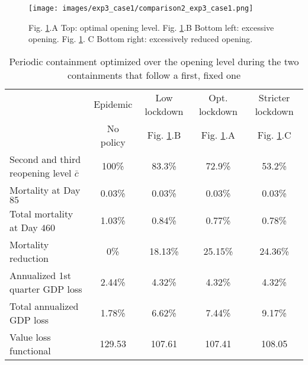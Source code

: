 \documentclass{amsart}
\begin{document}
\begin{figure}[h!]
    \centering
    \texttt{[image: images/exp3\_case1/comparison2\_exp3\_case1.png]}
    \caption{Fig. \ref{comparison2_exp3_case1}.A Top: optimal opening level. Fig. \ref{comparison2_exp3_case1}.B Bottom left: excessive opening. Fig. \ref{comparison2_exp3_case1}. C Bottom right: 
    excessively reduced opening.}
    \label{comparison2_exp3_case1}
\end{figure}


\begin{table}[htbp]
   \centering
  \caption{Periodic containment optimized over the
    opening level during the two containments 
    that follow a first, fixed one}
    \begin{tabular}{lcccc}
     & \multicolumn{1}{c}{Epidemic} & \multicolumn{1}{c}{ 
        Low lockdown} & \multicolumn{1}{c}{Opt. lockdown}& \multicolumn{1}{c}{Stricter lockdown} \\
          & \multicolumn{1}{c}{No policy } & \multicolumn{1}{c}{Fig. \ref{comparison2_exp3_case1}.B } & \multicolumn{1}{c}{Fig. \ref{comparison2_exp3_case1}.A } & \multicolumn{1}{c}{Fig. \ref{comparison2_exp3_case1}.C } \\ \hline \vspace{0.1cm}
    Second and third reopening level $\bar{c}$ & 100\% & 83.3\% & 72.9\% & 
    53.2\% \\  \vspace{0.1cm}   
   Mortality at Day $85$ & 0.03\%  & 0.03\%  & 0.03\%  & 0.03\% \\ \vspace{0.1cm}
    Total mortality at Day $460$ & 1.03\%  & 0.84\%  & 0.77\%  & 0.78\% \\ \vspace{0.1cm}
    Mortality reduction & 0\%  & 18.13\% & 25.15\% & 24.36\% \\ \vspace{0.1cm}
    Annualized 1st quarter GDP loss & 2.44\%  & 4.32\%  & 4.32\%  & 4.32\% \\ \vspace{0.1cm} 
    Total annualized GDP loss & 1.78\%  & 6.62\%  & 7.44\%  & 9.17\% \\ \vspace{0.1cm}   
     Value loss functional & 129.53 & 107.61 & 107.41 & 108.05\\ \hline    
    \end{tabular}%
  \label{tab:exp3_case1}%
\end{table}%
\end{document}
